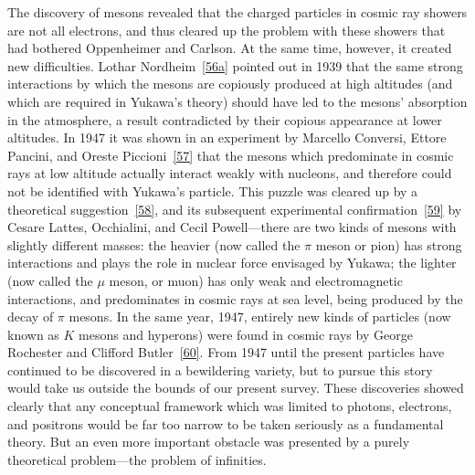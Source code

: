 The discovery of mesons revealed that the charged particles in cosmic ray
showers are not all electrons, and thus cleared up the problem with these
showers that had bothered Oppenheimer and Carlson. At the same time, however,
it created new difficulties. Lothar Nordheim~\hyperref[ref:1.56a]{[56a]} pointed out in 1939 that
the same strong interactions by which the mesons are copiously produced at
high altitudes (and which are required in Yukawa's theory) should have led to
the mesons' absorption in the atmosphere, a result contradicted by their
copious appearance at lower altitudes. In 1947 it was shown in an experiment
by Marcello Conversi, Ettore Pancini, and Oreste Piccioni~\hyperref[ref:1.57]{[57]} that the mesons
which predominate in cosmic rays at low altitude actually interact weakly
with nucleons, and therefore could not be identified with Yukawa's particle.
This puzzle was cleared up by a theoretical suggestion~\hyperref[ref:1.58]{[58]}, and its
subsequent experimental confirmation~\hyperref[ref:1.59]{[59]} by Cesare Lattes, Occhialini, and
Cecil Powell---there are two kinds of mesons with slightly different masses:
the heavier (now called the $\pi$ meson or pion) has strong interactions and
plays the role in nuclear force envisaged by Yukawa; the lighter (now called
the $\mu$ meson, or muon) has only weak and electromagnetic interactions, and
predominates in cosmic rays at sea level, being produced by the decay of
$\pi$ mesons. In the same year, 1947, entirely new kinds of particles (now
known as $K$ mesons and hyperons) were found in cosmic rays by George
Rochester and Clifford Butler~\hyperref[ref:1.60]{[60]}. From 1947 until the present particles have
continued to be discovered in a bewildering variety, but to pursue this story
would take us outside the bounds of our present survey. These discoveries
showed clearly that any conceptual framework which was limited to photons,
electrons, and positrons would be far too narrow to be taken seriously as a
fundamental theory. But an even more important obstacle was presented by a
purely theoretical problem---the problem of infinities.
